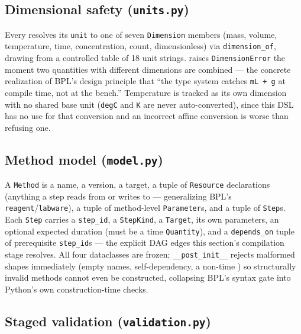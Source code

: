 \documentclass[
  english,
]{article}
\begin{document}
\subsection{\texorpdfstring{Dimensional safety
(\texttt{units.py})}{Dimensional safety (units.py)}}\label{dimensional-safety-units.py}

Every  resolves its \texttt{unit} to one
of seven \texttt{Dimension} members (mass, volume, temperature, time,
concentration, count, dimensionless) via \texttt{dimension\_of}, drawing
from a controlled table of 18 unit strings. 
raises \texttt{DimensionError} the moment two quantities with different
dimensions are combined --- the concrete realization of BPL's design
principle that ``the type system catches \texttt{mL\ +\ g} at compile
time, not at the bench.'' Temperature is tracked as its own dimension
with no shared base unit (\texttt{degC} and \texttt{K} are never
auto-converted), since this DSL has no use for that conversion and an
incorrect affine conversion is worse than refusing one.

\subsection{\texorpdfstring{Method model
(\texttt{model.py})}{Method model (model.py)}}\label{method-model-model.py}

A \texttt{Method} is a name, a version, a target, a tuple of
\texttt{Resource} declarations (anything a step reads from or writes to
--- generalizing BPL's \texttt{reagent}/\texttt{labware}), a tuple of
method-level \texttt{Parameter}s, and a tuple of \texttt{Step}s. Each
\texttt{Step} carries a \texttt{step\_id}, a \texttt{StepKind}, a
\texttt{Target}, its own parameters, an optional expected duration (must
be a time \texttt{Quantity}), and a \texttt{depends\_on} tuple of
prerequisite \texttt{step\_id}s --- the explicit DAG edges this
section's compilation stage resolves. All four dataclasses are frozen;
\texttt{\_\_post\_init\_\_} rejects malformed shapes immediately (empty
names, self-dependency, a non-time ) so
structurally invalid methods cannot even be constructed, collapsing
BPL's syntax gate into Python's own construction-time checks.

\subsection{\texorpdfstring{Staged validation
(\texttt{validation.py})}{Staged validation (validation.py)}}\label{staged-validation-validation.py}
\end{document}
